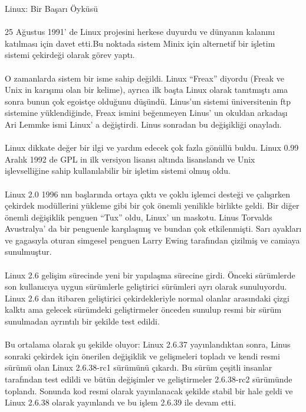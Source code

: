 \documentclass[10pt,a5paper]{book}
\begin{document}
\begin{section}{Linux: Bir Başarı Öyküsü}
\paragraph{}{25 Ağustus 1991’ de Linux projesini herkese duyurdu ve dünyanın kalanını katılması için davet etti.Bu noktada sistem Minix için alternetif bir işletim sistemi çekirdeği olarak görev yaptı.}
\paragraph{}{O zamanlarda sistem bir isme sahip değildi. Linux “Freax” diyordu (Freak ve Unix in karışımı olan bir kelime), ayrıca ilk başta Linux olarak tanıtmıştı ama sonra bunun çok egoistçe olduğunu düşündü. Linus’un sistemi üniversitenin ftp sistemine yüklendiğinde, Freax ismini beğenmeyen Linus’ un okuldan arkadaşı Ari Lemmke ismi Linux’ a değiştirdi. Linus sonradan bu değişikliği onayladı.}
\paragraph{}{Linux dikkate değer bir ilgi ve yardım edecek çok fazla gönüllü buldu. Linux 0.99 Aralık 1992 de GPL in ilk versiyon lisansı altında lisanslandı ve Unix işlevselliğine sahip kullanılabilir bir işletim sistemi olmuş oldu.}
\paragraph{}{Linux 2.0 1996 nın başlarında ortaya çıktı ve çoklu işlemci desteği ve çalışırken çekirdek modüllerini yükleme gibi bir çok önemli yenilikle birlikte geldi. Bir diğer önemli değişiklik penguen “Tux” oldu, Linux’ un maskotu.  Linus Torvalds Avustralya’ da bir penguenle karşılaşmış ve bundan çok etkilenmişti. Sarı ayakları ve gagasıyla oturan simgesel penguen Larry Ewing tarafından çizilmiş ve camiaya sunulmuştur.}
\paragraph{}{Linux 2.6 gelişim sürecinde yeni bir yapılaşma sürecine girdi. Önceki sürümlerde son kullanıcıya uygun sürümlerle geliştirici sürümleri ayrı olarak sunuluyordu. Linux 2.6 dan itibaren geliştirici çekirdekleriyle normal olanlar arasındaki çizgi kalktı ama gelecek sürümdeki geliştirmeler önceden sunulup resmi bir sürüm sunulmadan ayrıntılı bir şekilde test edildi.}
\paragraph{}{Bu ortalama olarak şu şekilde oluyor: Linux 2.6.37 yayınlandıktan sonra, Linus sonraki çekirdek için önerilen değişiklik ve gelişmeleri topladı ve kendi resmi sürümü olan Linux 2.6.38-rc1 sürümünü çıkardı. Bu sürüm çeşitli insanlar tarafından test edildi ve bütün değişimler ve geliştirmeler 2.6.38-rc2 sürümünde toplandı. Sonunda kod resmi olarak yayınlanacak şekilde stabil bir hale geldi ve Linux 2.6.38 olarak yayınlandı ve bu işlem 2.6.39 ile devam etti.}

\end{section}
\end{document}
